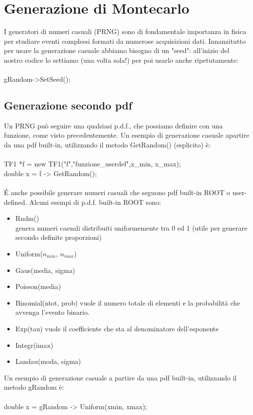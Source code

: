 \documentclass[10pt,a4paper]{article}
\begin{document}
\section{Generazione di Montecarlo}\label{sec:montecarlo}
I generatori di numeri casuali (PRNG) sono di fondamentale importanza in fisica per studiare eventi complessi formati da numerose acquisizioni dati. Innanzitutto per usare la generazione casuale abbiamo bisogno di un "seed": all'inizio del nostro codice lo settiamo (una volta sola!) per poi usarlo anche ripetutamente:\\\\
gRandom->SetSeed();
\subsection{Generazione secondo pdf}
Un PRNG può seguire una qualsiasi p.d.f., che possiamo definire con una funzione, come visto precedentemente. Un esempio di generazione casuale apartire da una pdf built-in, utilizzando il metodo GetRandom() (esplicito) è:\\\\
TF1 *f = new TF1("f","funzione\_userdef",x\_min, x\_max);\\
double x = f -> GetRandom();\\\\
\'E anche possibile generare numeri casuali che seguono pdf built-in ROOT o user-defined. Alcuni esempi di p.d.f. built-in ROOT sono: 
\begin{itemize}
	\item Rndm()\\
	genera numeri casuali distribuiti uniformemente tra 0 ed 1 (utile per generare secondo definite proporzioni)
	\item Uniform(\(n_{min}\), \(n_{max}\))
	\item Gaus(media, sigma)
	\item Poisson(media)
	\item Binomial(ntot, prob)
	vuole il numero totale di elementi e la probabilità che avvenga l'evento binario.
	\item Exp(tau)
	vuole il coefficiente che sta al denominatore dell'esponente
	\item Integr(imax)	
	\item Landau(moda, sigma)
\end{itemize}
Un esempio di generazione casuale a partire da una pdf built-in, utilizzando il metodo gRandom è:\\\\
double x = gRandom -> Uniform(xmin, xmax);\\\\
\end{document}
